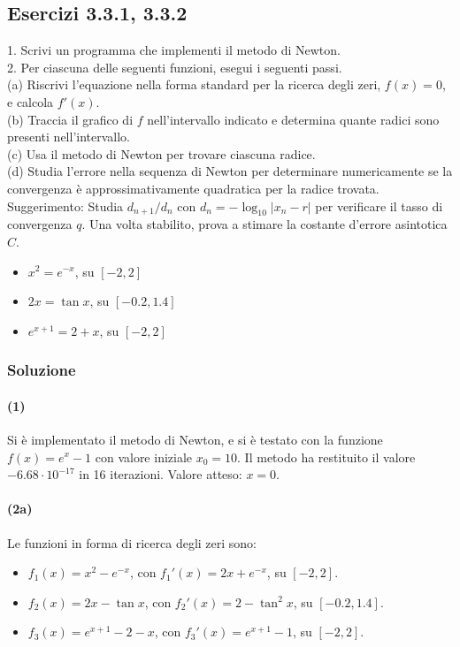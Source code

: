 \documentclass[letterpaper, 12pt]{article}
\begin{document}
\subsection{Esercizi 3.3.1, 3.3.2}
1. Scrivi un programma che implementi il metodo di Newton.\\
2. Per ciascuna delle seguenti funzioni, esegui i seguenti passi.\\  
(a) Riscrivi l'equazione nella forma standard per la ricerca degli zeri, $f(x) = 0$, e calcola $f'(x)$. \\
(b) Traccia il grafico di $f$ nell'intervallo indicato e determina quante radici sono presenti nell'intervallo. \\
(c) Usa il metodo di Newton per trovare ciascuna radice. \\
(d) Studia l'errore nella sequenza di Newton per determinare numericamente se la convergenza è approssimativamente quadratica per la radice trovata. \\
Suggerimento: Studia $d_{n+1}/d_{n}$ con $d_n=-\log_{10}|x_n-r|$ per verificare il tasso di convergenza $q$. Una volta stabilito, prova a stimare la costante d'errore asintotica $C$. \\
\begin{itemize}
    \item $x^2=e^{-x}$, su $[-2,2]$ \\
    \item $2x = \tan x$, su $[-0.2,1.4]$ \\
    \item $e^{x+1}=2+x$, su $[-2,2]$ \\
\end{itemize}
    
\subsubsection{Soluzione}
\paragraph{(1) } Si è implementato il metodo di Newton, e si è testato con la funzione $f(x)=e^x - 1$ con valore
iniziale $x_0 = 10$. Il metodo ha restituito il valore $-6.68 \cdot 10^{-17}$ in 16 iterazioni. 
Valore atteso: $x = 0$. \\

\paragraph{(2a) }\label{sec:332_2a} Le funzioni in forma di ricerca degli zeri sono:
\begin{itemize}
    \item $f_1(x) = x^2 - e^{-x}$, con $f_1'(x) = 2x + e^{-x}$, su $[-2,2]$.
    \item $f_2(x) = 2x - \tan x$, con $f_2'(x) = 2 - \tan^2 x$, su $[-0.2,1.4]$.
    \item $f_3(x) = e^{x+1} - 2 - x$, con $f_3'(x) = e^{x+1} - 1$, su $[-2,2]$.
\end{itemize}
\end{document}
